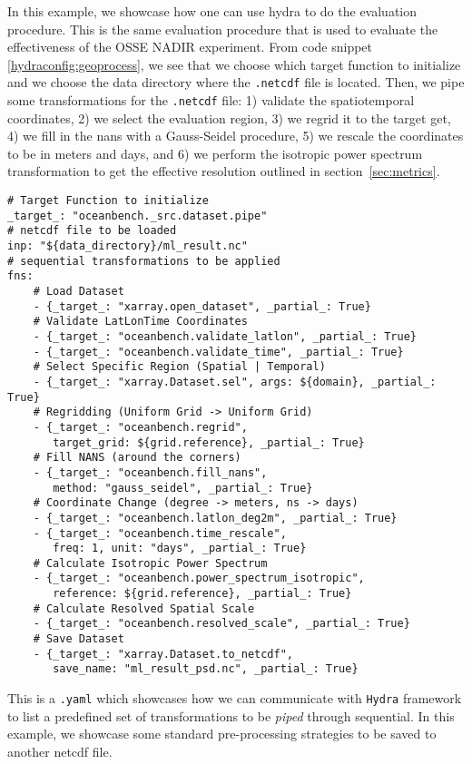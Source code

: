 In this example, we showcase how one can use hydra to do the evaluation procedure. This is the same evaluation procedure that is used to evaluate the effectiveness of the OSSE NADIR experiment. From code snippet~ \ref{hydraconfig:geoprocess}, we see that we choose which target function to initialize and we choose the data directory where the \texttt{.netcdf} file is located. Then, we pipe some transformations for the \texttt{.netcdf} file: 1) validate the spatiotemporal coordinates, 2) we select the evaluation region, 3) we regrid it to the target get, 4) we fill in the nans with a Gauss-Seidel procedure, 5) we rescale the coordinates to be in meters and days, and 6) we perform the isotropic power spectrum transformation to get the effective resolution outlined in section~\ref{sec:metrics}.

\begin{listing}[ht!]
\begin{verbatim}
# Target Function to initialize
_target_: "oceanbench._src.dataset.pipe"
# netcdf file to be loaded
inp: "${data_directory}/ml_result.nc"
# sequential transformations to be applied
fns:
    # Load Dataset
    - {_target_: "xarray.open_dataset", _partial_: True}
    # Validate LatLonTime Coordinates
    - {_target_: "oceanbench.validate_latlon", _partial_: True}
    - {_target_: "oceanbench.validate_time", _partial_: True}
    # Select Specific Region (Spatial | Temporal)
    - {_target_: "xarray.Dataset.sel", args: ${domain}, _partial_: True}
    # Regridding (Uniform Grid -> Uniform Grid)
    - {_target_: "oceanbench.regrid", 
       target_grid: ${grid.reference}, _partial_: True}
    # Fill NANS (around the corners)
    - {_target_: "oceanbench.fill_nans", 
       method: "gauss_seidel", _partial_: True}
    # Coordinate Change (degree -> meters, ns -> days)
    - {_target_: "oceanbench.latlon_deg2m", _partial_: True}
    - {_target_: "oceanbench.time_rescale", 
       freq: 1, unit: "days", _partial_: True}
    # Calculate Isotropic Power Spectrum
    - {_target_: "oceanbench.power_spectrum_isotropic", 
       reference: ${grid.reference}, _partial_: True}
    # Calculate Resolved Spatial Scale
    - {_target_: "oceanbench.resolved_scale", _partial_: True}
    # Save Dataset
    - {_target_: "xarray.Dataset.to_netcdf", 
       save_name: "ml_result_psd.nc", _partial_: True}
\end{verbatim}


\label{hydraconfig:evaluation}
\caption{This is a \texttt{.yaml} which showcases how we can communicate with \texttt{Hydra} framework to list a predefined set of transformations to be \textit{piped} through sequential. In this example, we showcase some standard pre-processing strategies to be saved to another netcdf file.}
\end{listing}




